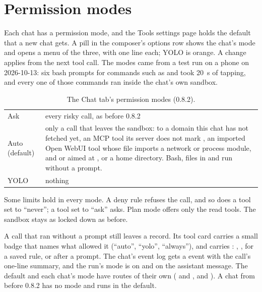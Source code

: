 \section{Permission modes}\label{sec:chat-modes}

Each chat has a permission mode, and the Tools settings page holds the default that a new chat gets. A pill in the composer's options row shows the chat's mode and opens a menu of the three, with one line each; YOLO is orange. A change applies from the next tool call. The modes came from a test run on a phone on 2026-10-13: six bash prompts for commands such as  and  took 20~s of tapping, and every one of those commands ran inside the chat's own sandbox.

\begin{table}[htbp]
\centering\small
\caption{The Chat tab's permission modes (0.8.2).}\label{tab:chat-modes}
\begin{tabularx}{\linewidth}{@{}L{.16\linewidth}Y@{}}
\toprule
{} &  \\
\midrule
Ask & every risky call, as before 0.8.2 \\
Auto (default) & only a call that leaves the sandbox:  to a domain this chat has not fetched yet, an MCP tool its server does not mark , an imported Open WebUI tool whose file imports a network or process module, and  or  aimed at \code{/},  or a home directory. Bash, files in  and  run without a prompt. \\
YOLO & nothing \\
\bottomrule
\end{tabularx}
\end{table}

Some limits hold in every mode. A deny rule refuses the call, and so does a tool set to \enquote{never}; a tool set to \enquote{ask} asks. Plan mode offers only the read tools. The sandbox stays as locked down as before.

A call that ran without a prompt still leaves a record. Its tool card carries a small badge that names what allowed it (\enquote{auto}, \enquote{yolo}, \enquote{always}), and  carries : , ,  for a saved rule, or  after a prompt. The chat's event log gets a  event with the call's one-line summary, and the run's mode is on  and on the assistant message. The default and each chat's mode have routes of their own ( and , and ). A chat from before 0.8.2 has no mode and runs in the default.

